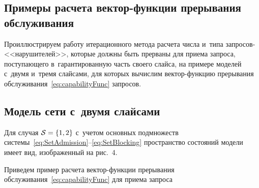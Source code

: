 \begin{multicols}{2}
\vspace*{-24pt}


\section{Примеры расчета вектор-функции прерывания 
обслуживания}

\vspace*{-12pt}

Проиллюстрируем работу итерационного метода расчета числа и~типа запросов-<<на\-ру\-ши\-те\-лей>>, 
которые должны быть прерваны для приема запроса, поступающего 
в~гарантированную часть своего слайса, на примере моделей с~двумя и~тремя 
слайсами, для которых вычислим век\-тор-функ\-цию прерывания 
обслуживания~\eqref{eq:capabilityFunc} запросов.

\vspace*{-12pt}


\subsection{Модель сети с~двумя слайсами}

\vspace*{-12pt}

Для случая $\mathcal{S}\hm=\{1,2\}$ с~учетом основных подмножеств системы~\eqref{eq:SetAdmission}--\eqref{eq:SetBlocking} 
пространство состояний модели 
имеет вид, изображенный на рис.~4.

Приведем пример расчета век\-тор-функ\-ции прерывания 
обслуживания~\eqref{eq:capabilityFunc} для приема запроса\linebreak\vspace*{-12pt}

\begin{table*}\small %
\begin{center}
\label{tab:SlicesAndCharacteristics}
\vspace*{2ex}


\end{center}
\end{table*}
\end{multicols}
